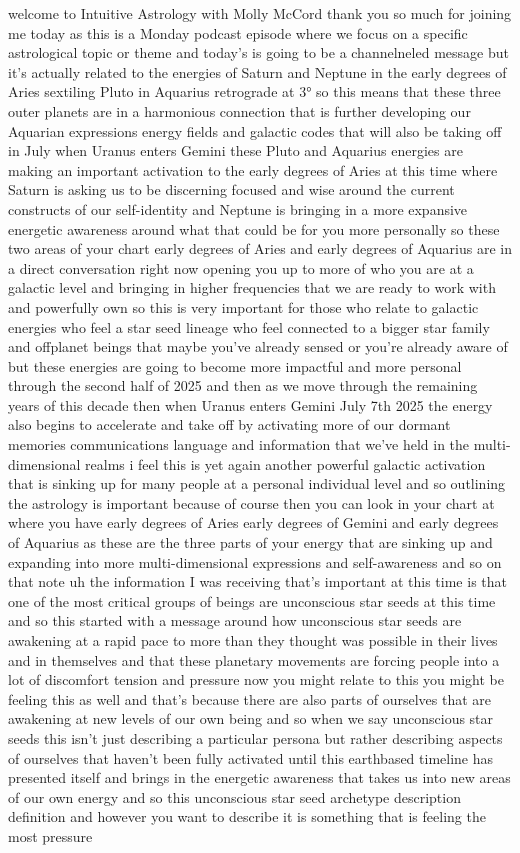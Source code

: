 \documentclass{article}
\begin{document}
welcome to Intuitive Astrology with Molly McCord thank you so much for joining me today as this is a Monday podcast episode where we focus on a specific astrological topic or theme and today's is going to be a channelneled message but it's actually related to the energies of Saturn and Neptune in the early degrees of Aries sextiling Pluto in Aquarius retrograde at 3° so this means that these three outer planets are in a harmonious connection that is further developing our Aquarian expressions energy fields and galactic codes that will also be taking off in July when Uranus enters Gemini these Pluto and Aquarius energies are making an important activation to the early degrees of Aries at this time where Saturn is asking us to be discerning focused and wise around the current constructs of our self-identity and Neptune is bringing in a more expansive energetic awareness around what that could be for you more personally so these two areas of your chart early degrees of Aries and early degrees of Aquarius are in a direct conversation right now opening you up to more of who you are at a galactic level and bringing in higher frequencies that we are ready to work with and powerfully own so this is very important for those who relate to galactic energies who feel a star seed lineage who feel connected to a bigger star family and offplanet beings that maybe you've already sensed or you're already aware of but these energies are going to become more impactful and more personal through the second half of 2025 and then as we move through the remaining years of this decade then when Uranus enters Gemini July 7th 2025 the energy also begins to accelerate and take off by activating more of our dormant memories communications language and information that we've held in the multi-dimensional realms i feel this is yet again another powerful galactic activation that is sinking up for many people at a personal individual level and so outlining the astrology is important because of course then you can look in your chart at where you have early degrees of Aries early degrees of Gemini and early degrees of Aquarius as these are the three parts of your energy that are sinking up and expanding into more multi-dimensional expressions and self-awareness and so on that note uh the information I was receiving that's important at this time is that one of the most critical groups of beings are unconscious star seeds at this time and so this started with a message around how unconscious star seeds are awakening at a rapid pace to more than they thought was possible in their lives and in themselves and that these planetary movements are forcing people into a lot of discomfort tension and pressure now you might relate to this you might be feeling this as well and that's because there are also parts of ourselves that are awakening at new levels of our own being and so when we say unconscious star seeds this isn't just describing a particular persona but rather describing aspects of ourselves that haven't been fully activated until this earthbased timeline has presented itself and brings in the energetic awareness that takes us into new areas of our own energy and so this unconscious star seed archetype description definition and however you want to describe it is something that is feeling the most pressure 
\end{document}

